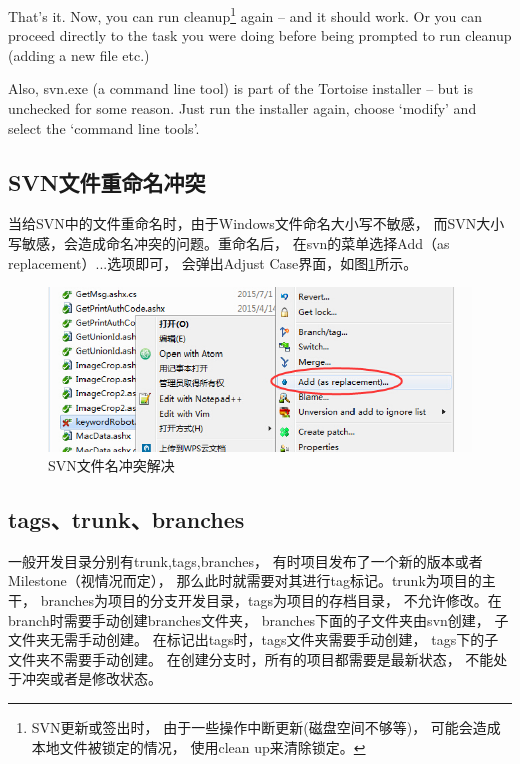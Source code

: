 \documentclass{book}
\begin{document}
That’s it. Now, you can run cleanup\footnote{SVN更新或签出时，
由于一些操作中断更新(磁盘空间不够等)，
可能会造成本地文件被锁定的情况，
使用clean up来清除锁定。} 
again – and it should work. 
Or you can proceed directly to the task you were doing before being prompted to run cleanup (adding a new file etc.)

Also, svn.exe (a command line tool) is part of the Tortoise 
installer – but is unchecked for some reason. Just run the installer again, 
choose ‘modify’ and select the ‘command line tools’.

\subsection{SVN文件重命名冲突}

当给SVN中的文件重命名时，由于Windows文件命名大小写不敏感，
而SVN大小写敏感，会造成命名冲突的问题。重命名后，
在svn的菜单选择Add（as replacement）...选项即可，
会弹出Adjust Case界面，如图\ref{fig:SVNRenameFileConflictSolve}所示。

\begin{figure}[htbp]
	\centering
	\includegraphics[scale=0.8]{SVNRenameFileConflictSolve.jpg}
	\caption{SVN文件名冲突解决}
	\label{fig:SVNRenameFileConflictSolve}
\end{figure}


\subsection{tags、trunk、branches}

一般开发目录分别有trunk,tags,branches，
有时项目发布了一个新的版本或者Milestone（视情况而定），
那么此时就需要对其进行tag标记。trunk为项目的主干，
branches为项目的分支开发目录，tags为项目的存档目录，
不允许修改。在branch时需要手动创建branches文件夹，
branches下面的子文件夹由svn创建，
子文件夹无需手动创建。
在标记出tags时，tags文件夹需要手动创建，
tags下的子文件夹不需要手动创建。
在创建分支时，所有的项目都需要是最新状态，
不能处于冲突或者是修改状态。
\end{document}
